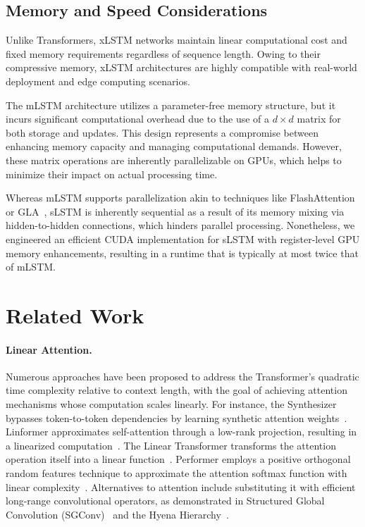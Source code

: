 \subsection{Memory and Speed Considerations}

Unlike Transformers, xLSTM networks maintain linear computational cost and fixed memory requirements regardless of sequence length. Owing to their compressive memory, xLSTM architectures are highly compatible with real-world deployment and edge computing scenarios.

The mLSTM architecture utilizes a parameter-free memory structure, but it incurs significant computational overhead due to the use of a $d \times d$ matrix for both storage and updates. This design represents a compromise between enhancing memory capacity and managing computational demands. However, these matrix operations are inherently parallelizable on GPUs, which helps to minimize their impact on actual processing time.

Whereas mLSTM supports parallelization akin to techniques like FlashAttention~\citep{Dao:22,Dao:23} or GLA~\citep{Yang:23arxiv}, sLSTM is inherently sequential as a result of its memory mixing via hidden-to-hidden connections, which hinders parallel processing. Nonetheless, we engineered an efficient CUDA implementation for sLSTM with register-level GPU memory enhancements, resulting in a runtime that is typically at most twice that of mLSTM.

\section{Related Work}
\label{sec:related}

\paragraph{Linear Attention.} Numerous approaches have been proposed to address the Transformer’s quadratic time complexity relative to context length, with the goal of achieving attention mechanisms whose computation scales linearly. For instance, the Synthesizer bypasses token-to-token dependencies by learning synthetic attention weights~\citep{Tay:20arxiv}. Linformer approximates self-attention through a low-rank projection, resulting in a linearized computation~\citep{Wang:20arxiv}. The Linear Transformer transforms the attention operation itself into a linear function~\citep{Katharopoulos:20}. Performer employs a positive orthogonal random features technique to approximate the attention softmax function with linear complexity~\citep{Choromanski:21}. Alternatives to attention include substituting it with efficient long-range convolutional operators, as demonstrated in Structured Global Convolution (SGConv)~\citep{Li:22} and the Hyena Hierarchy~\citep{Poli:23}.

